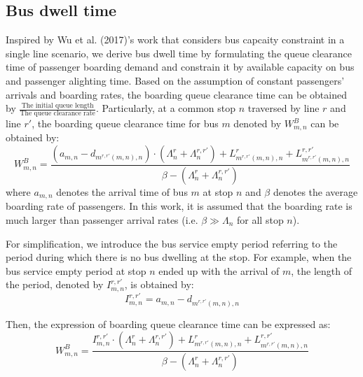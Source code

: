 \documentclass[smallextended]{svjour3}       %
\begin{document}
\begin{Abstract}
\subsection{Bus dwell time}
Inspired by Wu et al. (2017)'s work that considers bus capcaity constraint in a single line scenario, we derive bus dwell time by formulating the queue clearance time of passenger boarding demand 
and constrain it by available capacity on bus and passenger alighting time.
Based on the assumption of constant passengers' arrivals and boarding rates, 
the boarding queue clearance time can be obtained by 
$\frac{\text{The initial queue length}}{\text{The queue clearance rate}}$. 
Particularly, at a common stop $n$ traversed by line $r$ and line $r'$, 
the boarding queue clearance time for bus $m$ denoted by $W_{m,n}^{B}$ can be obtained by:
\begin{equation}
    W_{m,n}^{B} = \frac{\left(a_{m,n}-d_{m^{r,r'}(m,n),n}\right)\cdot \left(\Lambda_{n}^{r}+\Lambda_{n}^{r,r'}\right)
    +L_{m^{r,r'}(m,n),n}^{r}+L_{m^{r,r'}(m,n),n}^{r,r'}}
    {\beta-\left(\Lambda_{n}^{r}+\Lambda_{n}^{r,r'}\right)}
\end{equation}
where $a_{m,n}$ denotes the arrival time of bus $m$ at stop $n$ 
and $\beta$ denotes the average boarding rate of passengers. 
In this work, it is assumed that the boarding rate is much larger than 
passenger arrival rates (i.e. $\beta \gg \Lambda_{n}$ for all stop $n$). 

For simplification, 
we introduce the bus service empty period referring to the period during which there is no bus dwelling at the stop. 
For example, when the bus service empty period at stop $n$ ended up with the arrival of $m$, 
the length of the period, denoted by $I_{m,n}^{r,r'}$, is obtained by:
\begin{equation}
    I_{m,n}^{r,r'} = a_{m,n} - d_{m^{r,r'}(m,n),n}
\end{equation}

Then, the expression of boarding queue clearance time can be expressed as:
\begin{equation}
    \label{equ:WB}
    W_{m,n}^{B} = \frac{I_{m,n}^{r,r'}\cdot \left(\Lambda_{n}^{r}+\Lambda_{n}^{r,r'}\right)
    +L_{m^{r,r'}(m,n),n}^{r}+L_{m^{r,r'}(m,n),n}^{r,r'}}
    {\beta-\left(\Lambda_{n}^{r}+\Lambda_{n}^{r,r'}\right)}
\end{equation}


\end{Abstract}
\end{document}
